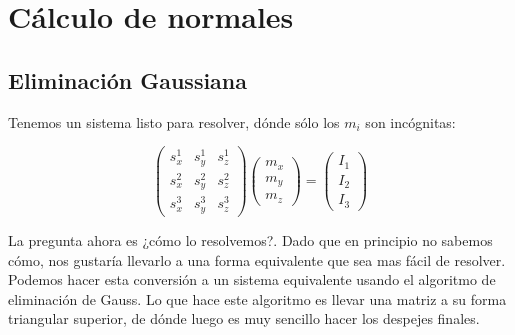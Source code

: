 


\section{Cálculo de normales}


\subsection{Eliminación Gaussiana}

Tenemos un sistema listo para resolver, dónde sólo los $m_i$ son incógnitas:

\[
\begin{pmatrix}
    s_{x}^{1} & s_{y}^{1} & s_{z}^{1} \\
    s_{x}^{2} & s_{y}^{2} & s_{z}^{2} \\
    s_{x}^{3} & s_{y}^{3} & s_{z}^{3}
\end{pmatrix}
\begin{pmatrix}
    m_{x} \\
    m_{y} \\
    m_{z}
\end{pmatrix}
=
\begin{pmatrix}
    I_{1} \\
    I_{2} \\
    I_{3}
\end{pmatrix}
\]

La pregunta ahora es ¿cómo lo resolvemos?. Dado que en principio no sabemos cómo, nos gustaría llevarlo a una forma equivalente que sea mas fácil de resolver. Podemos hacer esta conversión a un sistema equivalente usando el algoritmo de eliminación de Gauss. Lo que hace este algoritmo es llevar una matriz a su forma triangular superior, de dónde luego es muy sencillo hacer los despejes finales. \\

